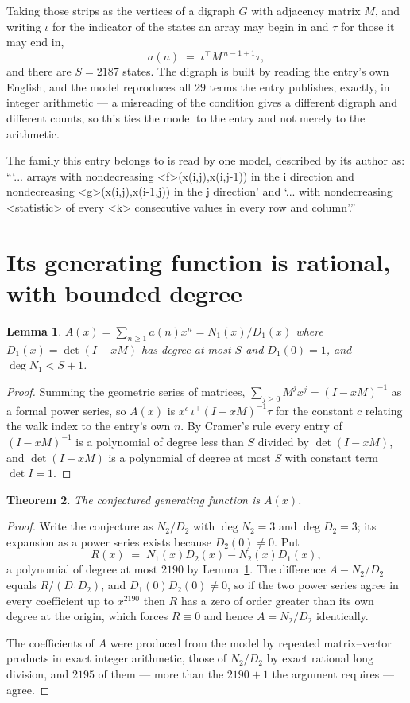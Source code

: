 \documentclass[11pt,a4paper]{article}
\theoremstyle{plain}
\newtheorem{theorem}{Theorem}
\newtheorem{lemma}[theorem]{Lemma}
\theoremstyle{definition}
\begin{document}
Taking those strips as the vertices of a digraph $G$ with adjacency matrix $M$, and writing
$\iota$ for the indicator of the states an array may begin in and $\tau$ for those it may end
in,
\[
a(n)\;=\;\iota^{\!\top}M^{\,n-1+1}\tau ,
\]
and there are $S=2187$ states. The digraph is built by reading the entry's own English, and the
model reproduces all $29$ terms the entry publishes, exactly, in integer arithmetic --- a
misreading of the condition gives a different digraph and different counts, so this ties the
model to the entry and not merely to the arithmetic.

The family this entry belongs to is read by one model, described by its author as: ```... arrays with nondecreasing <f>(x(i,j),x(i,j-1)) in the i direction and nondecreasing <g>(x(i,j),x(i-1,j)) in the j direction' and `... with nondecreasing <statistic> of every <k> consecutive values in every row and column'.''


\section{Its generating function is rational, with bounded degree}

\begin{lemma}\label{lem:rat}
$A(x)=\sum_{n\ge1}a(n)x^n=N_1(x)/D_1(x)$ where $D_1(x)=\det(I-xM)$ has degree at most
$S$ and $D_1(0)=1$, and $\deg N_1<S+1$.
\end{lemma}

\begin{proof}
Summing the geometric series of matrices, $\sum_{j\ge0}M^jx^j=(I-xM)^{-1}$ as a formal
power series, so $A(x)$ is $x^{c}\,\iota^{\!\top}(I-xM)^{-1}\tau$ for the constant $c$
relating the walk index to the entry's own $n$. By Cramer's rule every entry of
$(I-xM)^{-1}$ is a polynomial of degree less than $S$ divided by $\det(I-xM)$, and
$\det(I-xM)$ is a polynomial of degree at most $S$ with constant term $\det I=1$.
\end{proof}

\begin{theorem}
The conjectured generating function is $A(x)$.
\end{theorem}

\begin{proof}
Write the conjecture as $N_2/D_2$ with $\deg N_2=3$ and $\deg D_2=3$; its expansion as a
power series exists because $D_2(0)\neq0$. Put
\[
R(x)\;=\;N_1(x)D_2(x)-N_2(x)D_1(x),
\]
a polynomial of degree at most $2190$ by Lemma~\ref{lem:rat}. The difference
$A-N_2/D_2$ equals $R/(D_1D_2)$, and $D_1(0)D_2(0)\neq0$, so if the two power series agree in
every coefficient up to $x^{2190}$ then $R$ has a zero of order greater than its own
degree at the origin, which forces $R\equiv0$ and hence $A=N_2/D_2$ identically.

The coefficients of $A$ were produced from the model by repeated matrix--vector products in
exact integer arithmetic, those of $N_2/D_2$ by exact rational long division, and $2195$
of them --- more than the $2190+1$ the argument requires --- agree.
\end{proof}
\end{document}
